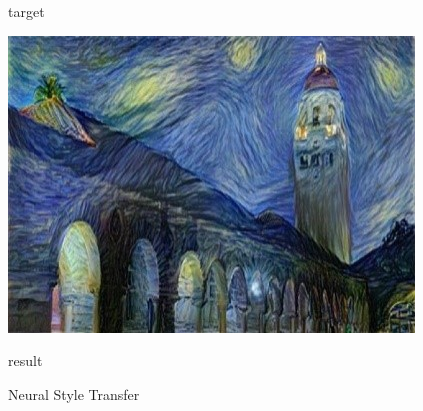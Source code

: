 \documentclass[12pt]{article}
\begin{document}
\begin{figure}[H]
\begin{minipage}{0.32\linewidth}
			\centerline{target}
		\end{minipage}
		\begin{minipage}{0.32\linewidth}
			\vspace{3pt}
			\centerline{\includegraphics[width=\textwidth]{images/Figure5-3.jpg}}
			
			\centerline{result}
		\end{minipage}
		
		\caption{Neural Style Transfer}
		\label{fig5}
	\end{figure}
	
\end{document}
